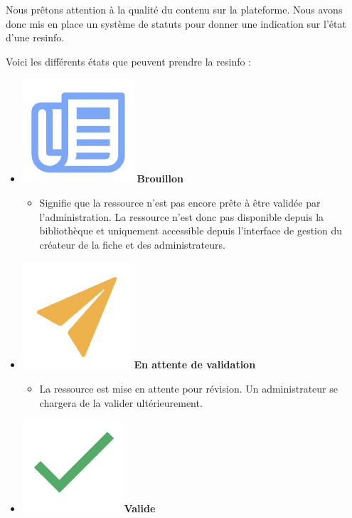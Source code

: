 Nous prêtons attention à la qualité du contenu sur la plateforme. Nous avons donc mis en place un système de statuts pour donner une indication sur l'état d'une \gls{resinfo}.

Voici les différents états que peuvent prendre la \gls{resinfo} :

\begin{itemize}
    \item \includegraphics[valign=b,height=1.4\fontcharht\font`X]{images/client/draft.png} \textbf{Brouillon}
    \begin{itemize}
        \item Signifie que la ressource n'est pas encore prête à être validée par l'administration. La ressource n'est donc pas disponible depuis la bibliothèque et uniquement accessible depuis l'interface de gestion du créateur de la \gls{fiche} et des administrateurs.
    \end{itemize}
    \item \includegraphics[valign=b,height=1.4\fontcharht\font`X]{images/client/pending.png} \textbf{En attente de validation}
    \begin{itemize}
        \item La ressource est mise en attente pour révision. Un administrateur se chargera de la valider ultérieurement.
    \end{itemize}
    \item \includegraphics[valign=b,height=1.4\fontcharht\font`X]{images/client/validated.png} \textbf{Valide}

\end{itemize}
